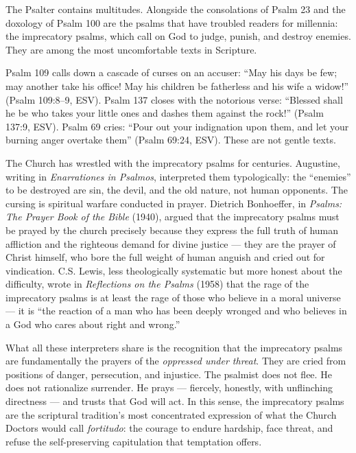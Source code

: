 \documentclass[10pt, letterpaper, twocolumn]{article}
\begin{document}
The Psalter contains multitudes. Alongside the consolations of Psalm 23 and the doxology of Psalm 100 are the psalms that have troubled readers for millennia: the imprecatory psalms, which call on God to judge, punish, and destroy enemies. They are among the most uncomfortable texts in Scripture.

Psalm 109 calls down a cascade of curses on an accuser: ``May his days be few; may another take his office! May his children be fatherless and his wife a widow!'' (Psalm 109:8--9, ESV). Psalm 137 closes with the notorious verse: ``Blessed shall he be who takes your little ones and dashes them against the rock!'' (Psalm 137:9, ESV). Psalm 69 cries: ``Pour out your indignation upon them, and let your burning anger overtake them'' (Psalm 69:24, ESV). These are not gentle texts.

The Church has wrestled with the imprecatory psalms for centuries. Augustine, writing in \emph{Enarrationes in Psalmos}, interpreted them typologically: the ``enemies'' to be destroyed are sin, the devil, and the old nature, not human opponents. The cursing is spiritual warfare conducted in prayer. Dietrich Bonhoeffer, in \emph{Psalms: The Prayer Book of the Bible} (1940), argued that the imprecatory psalms must be prayed by the church precisely because they express the full truth of human affliction and the righteous demand for divine justice --- they are the prayer of Christ himself, who bore the full weight of human anguish and cried out for vindication. C.S. Lewis, less theologically systematic but more honest about the difficulty, wrote in \emph{Reflections on the Psalms} (1958) that the rage of the imprecatory psalms is at least the rage of those who believe in a moral universe --- it is ``the reaction of a man who has been deeply wronged and who believes in a God who cares about right and wrong.''

What all these interpreters share is the recognition that the imprecatory psalms are fundamentally the prayers of the \emph{oppressed under threat}. They are cried from positions of danger, persecution, and injustice. The psalmist does not flee. He does not rationalize surrender. He prays --- fiercely, honestly, with unflinching directness --- and trusts that God will act. In this sense, the imprecatory psalms are the scriptural tradition's most concentrated expression of what the Church Doctors would call \emph{fortitudo}: the courage to endure hardship, face threat, and refuse the self-preserving capitulation that temptation offers.
\end{document}
